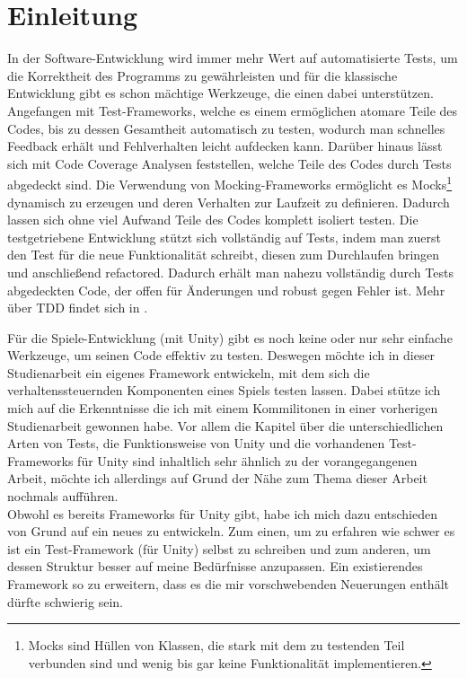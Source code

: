 \chapter{Einleitung}

In der Software-Entwicklung wird immer mehr Wert auf automatisierte Tests, um die Korrektheit des Programms zu gewährleisten und für die klassische Entwicklung gibt es schon mächtige Werkzeuge, die einen dabei unterstützen. Angefangen mit Test-Frameworks, welche es einem ermöglichen atomare Teile des Codes, bis zu dessen Gesamtheit automatisch zu testen, wodurch man schnelles Feedback erhält und Fehlverhalten leicht aufdecken kann. Darüber hinaus lässt sich mit Code Coverage Analysen feststellen, welche Teile des Codes durch Tests abgedeckt sind. Die Verwendung von Mocking-Frameworks ermöglicht es Mocks\footnote{Mocks sind Hüllen von Klassen, die stark mit dem zu testenden Teil verbunden sind und wenig bis gar keine Funktionalität implementieren.} dynamisch zu erzeugen und deren Verhalten zur Laufzeit zu definieren. Dadurch lassen sich ohne viel Aufwand Teile des Codes komplett isoliert testen. Die testgetriebene Entwicklung stützt sich vollständig auf Tests, indem man zuerst den Test für die neue Funktionalität schreibt, diesen zum Durchlaufen bringen und anschließend refactored. Dadurch erhält man nahezu vollständig durch Tests abgedeckten Code, der offen für Änderungen und robust gegen Fehler ist. Mehr über TDD findet sich in \cite{FRE10}.

Für die Spiele-Entwicklung (mit Unity) gibt es noch keine oder nur sehr einfache Werkzeuge, um seinen Code effektiv zu testen. Deswegen möchte ich in dieser Studienarbeit ein eigenes Framework entwickeln, mit dem sich die verhaltenssteuernden Komponenten eines Spiels testen lassen. Dabei stütze ich mich auf die Erkenntnisse die ich mit einem Kommilitonen in einer vorherigen Studienarbeit \cite{TDGD13} gewonnen habe. Vor allem die Kapitel über die unterschiedlichen Arten von Tests, die Funktionsweise von Unity und die vorhandenen Test-Frameworks für Unity sind inhaltlich sehr ähnlich zu der vorangegangenen Arbeit, möchte ich allerdings auf Grund der Nähe zum Thema dieser Arbeit nochmals aufführen.\\
Obwohl es bereits Frameworks für Unity gibt, habe ich mich dazu entschieden von Grund auf ein neues zu entwickeln. Zum einen, um zu erfahren wie schwer es ist ein Test-Framework (für Unity) selbst zu schreiben und zum anderen, um dessen Struktur besser auf meine Bedürfnisse anzupassen. Ein existierendes Framework so zu erweitern, dass es die mir vorschwebenden Neuerungen enthält dürfte schwierig sein.

